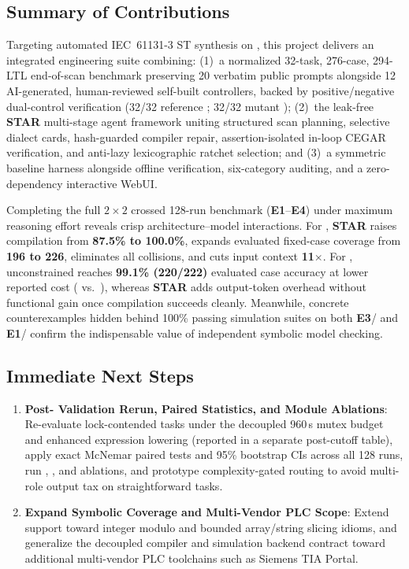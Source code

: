 \subsection{Summary of Contributions}
Targeting automated IEC~61131-3 ST synthesis on , this project delivers an integrated engineering suite combining: (1)~a normalized 32-task, 276-case, 294-LTL end-of-scan benchmark preserving 20 verbatim public prompts alongside 12 AI-generated, human-reviewed self-built controllers, backed by positive/negative dual-control verification (32/32 reference ; 32/32 mutant ); (2)~the leak-free \textbf{STAR} multi-stage agent framework uniting structured scan planning, selective dialect cards, hash-guarded compiler repair, assertion-isolated in-loop  CEGAR verification, and anti-lazy lexicographic ratchet selection; and (3)~a symmetric  baseline harness alongside offline  verification, six-category  auditing, and a zero-dependency interactive WebUI.

Completing the full $2 \times 2$ crossed 128-run benchmark (\textbf{E1}--\textbf{E4}) under maximum reasoning effort reveals crisp architecture--model interactions. For , \textbf{STAR} raises compilation from \textbf{87.5\% to 100.0\%}, expands evaluated fixed-case coverage from \textbf{196 to 226}, eliminates all  collisions, and cuts input context \textbf{11$\times$}. For , unconstrained  reaches \textbf{99.1\% (220/222)} evaluated case accuracy at lower reported cost ( vs.\ ), whereas \textbf{STAR} adds output-token overhead without functional gain once compilation succeeds cleanly. Meanwhile, concrete counterexamples hidden behind 100\% passing simulation suites on both \textbf{E3}/ and \textbf{E1}/ confirm the indispensable value of independent symbolic model checking.

\subsection{Immediate Next Steps}
\begin{enumerate}
  \item \textbf{Post- Validation Rerun, Paired Statistics, and Module Ablations}: Re-evaluate lock-contended tasks under the decoupled 960\,s mutex budget and enhanced expression lowering (reported in a separate post-cutoff table), apply exact McNemar paired tests and 95\% bootstrap CIs across all 128 runs, run , , and  ablations, and prototype complexity-gated routing to avoid multi-role output tax on straightforward tasks.
  \item \textbf{Expand Symbolic Coverage and Multi-Vendor PLC Scope}: Extend  support toward integer modulo and bounded array/string slicing idioms, and generalize the decoupled compiler and simulation backend contract toward additional multi-vendor PLC toolchains such as Siemens TIA Portal.
\end{enumerate}

